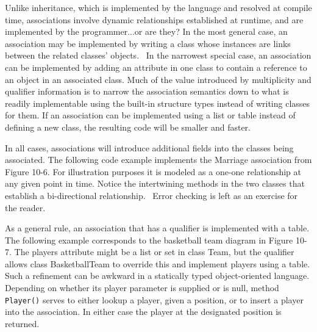 Unlike inheritance, which is implemented by the language and resolved at
compile time, associations involve dynamic
relationships established at runtime, and are implemented by the
programmer...or are they? In the most general case, an association may
be implemented by writing a class whose instances are links between the
related classes' objects. \ In the narrowest special
case, an association can be implemented by adding an attribute in one
class to contain a reference to an object in an
associated class. Much of the value introduced by multiplicity and
qualifier information is to narrow the association semantics down to
what is readily implementable using the built-in structure types
instead of writing classes for them. If an association can be
implemented using a list or table instead of defining a new class, the
resulting code will be smaller and faster.

In all cases, associations will introduce additional fields into the
classes being associated. The following code example implements the
Marriage association from Figure 10-6. For illustration purposes it is
modeled as a one-one relationship at any given point in time. Notice
the intertwining methods in the two classes that establish a
bi-directional relationship. \ Error checking is left as an exercise
for the reader.


As a general rule, an association that has a qualifier is implemented
with a table. The following example corresponds to
the basketball team diagram in Figure 10-7. The players attribute might
be a list or set in class Team, but the qualifier allows class
BasketballTeam to override this and implement players using a table.
Such a refinement can be awkward in a statically typed object-oriented
language.
Depending on whether its player parameter is supplied or is null, method
\texttt{Player()} serves to either lookup a player, given a position,
or to insert a player into the association. In either case the player
at the designated position is returned.

